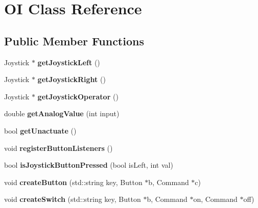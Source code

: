 \hypertarget{class_o_i}{}\section{O\+I Class Reference}
\label{class_o_i}
\subsection*{Public Member Functions}
\begin{DoxyCompactItemize}
\item 
\hypertarget{class_o_i_a44e3993b74e84ff3f42e085bf2339fd3}{}Joystick $\ast$ {\bfseries get\+Joystick\+Left} ()\label{class_o_i_a44e3993b74e84ff3f42e085bf2339fd3}

\item 
\hypertarget{class_o_i_a3e6f636adbcd28305a128c60ed37ca51}{}Joystick $\ast$ {\bfseries get\+Joystick\+Right} ()\label{class_o_i_a3e6f636adbcd28305a128c60ed37ca51}

\item 
\hypertarget{class_o_i_ab94df2d2b7daef071403aaa68f0c2110}{}Joystick $\ast$ {\bfseries get\+Joystick\+Operator} ()\label{class_o_i_ab94df2d2b7daef071403aaa68f0c2110}

\item 
\hypertarget{class_o_i_ab12f69fdde64ee428a470050108f7723}{}double {\bfseries get\+Analog\+Value} (int input)\label{class_o_i_ab12f69fdde64ee428a470050108f7723}

\item 
\hypertarget{class_o_i_a1235966866aa76065043d7f222ac5347}{}bool {\bfseries get\+Unactuate} ()\label{class_o_i_a1235966866aa76065043d7f222ac5347}

\item 
\hypertarget{class_o_i_a30153c1afd5cb73f706423af66587f01}{}void {\bfseries register\+Button\+Listeners} ()\label{class_o_i_a30153c1afd5cb73f706423af66587f01}

\item 
\hypertarget{class_o_i_aabe980a3191aaa7686ca122bb75fa64c}{}bool {\bfseries is\+Joystick\+Button\+Pressed} (bool is\+Left, int val)\label{class_o_i_aabe980a3191aaa7686ca122bb75fa64c}

\item 
\hypertarget{class_o_i_a1c96a260ead07267f186e0c10a059061}{}void {\bfseries create\+Button} (std\+::string key, Button $\ast$b, Command $\ast$c)\label{class_o_i_a1c96a260ead07267f186e0c10a059061}

\item 
\hypertarget{class_o_i_a23e8ce4df96cae959ff5f27610400fb0}{}void {\bfseries create\+Switch} (std\+::string key, Button $\ast$b, Command $\ast$on, Command $\ast$off)\label{class_o_i_a23e8ce4df96cae959ff5f27610400fb0}

\end{DoxyCompactItemize}
